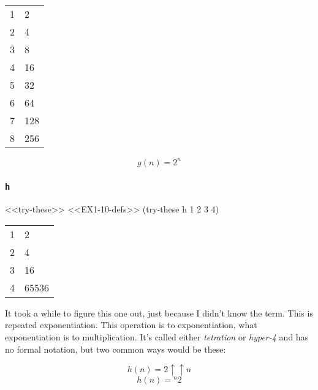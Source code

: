 \documentclass[
]{article}
\newenvironment{Shaded}{}{}
\newcommand{\DecValTok}[1]{\textcolor[rgb]{0.25,0.63,0.44}{#1}}
\newcommand{\NormalTok}[1]{#1}
\begin{document}
\begin{longtable}[]{@{}ll@{}}
\toprule
\endhead
1 & 2 \\
2 & 4 \\
3 & 8 \\
4 & 16 \\
5 & 32 \\
6 & 64 \\
7 & 128 \\
8 & 256 \\
\bottomrule
\end{longtable}

\[
g(n)=2^n
\]

\hypertarget{h}{%
\subsubsection{\texorpdfstring{\texttt{h}}{h}}\label{h}}

\begin{Shaded}
\begin{Highlighting}[numbers=left,,]
\NormalTok{\textless{}\textless{}try{-}these\textgreater{}\textgreater{}}
\NormalTok{\textless{}\textless{}EX1{-}10{-}defs\textgreater{}\textgreater{}}
\NormalTok{(try{-}these h }\DecValTok{1} \DecValTok{2} \DecValTok{3} \DecValTok{4}\NormalTok{)}
\end{Highlighting}
\end{Shaded}

\begin{longtable}[]{@{}ll@{}}
\toprule
\endhead
1 & 2 \\
2 & 4 \\
3 & 16 \\
4 & 65536 \\
\bottomrule
\end{longtable}

It took a while to figure this one out, just because I didn't know the
term. This is repeated exponentiation. This operation is to
exponentiation, what exponentiation is to multiplication. It's called
either \emph{tetration} or \emph{hyper-4} and has no formal notation,
but two common ways would be these:

\[
h(n)=2 \uparrow\uparrow n
\] \[
h(n)={}^{n}2
\]
\end{document}
